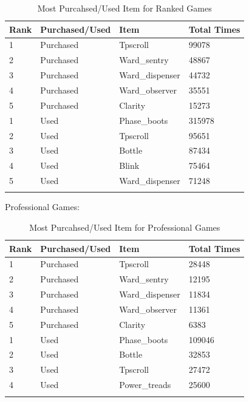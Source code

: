 \documentclass{article}
\begin{document}
\begin{longtable}{|p{2cm}|p{2cm}|p{3.5cm}|p{2.5cm}|}

\hline
\textbf{Rank} & \textbf{Purchased/Used} & \textbf{Item} & \textbf{Total Times} \\
\hline
\endhead

1 & Purchased & Tpscroll & 99078 \\\hline
2 & Purchased & Ward\_sentry & 48867 \\\hline
3 & Purchased & Ward\_dispenser & 44732 \\\hline
4 & Purchased & Ward\_observer & 35551 \\\hline
5 & Purchased & Clarity & 15273 \\\hline
1 & Used & Phase\_boots & 315978 \\\hline
2 & Used & Tpscroll & 95651 \\\hline
3 & Used & Bottle & 87434 \\\hline
4 & Used & Blink & 75464 \\\hline
5 & Used & Ward\_dispenser & 71248 \\\hline

\caption{Most Purcahsed/Used Item for Ranked Games}
\label{most-purchased-used-item-for-ranked-games}
\end{longtable}


Professional Games:

\begin{longtable}{|p{2cm}|p{2cm}|p{3.5cm}|p{2.5cm}|}

\hline
\textbf{Rank} & \textbf{Purchased/Used} & \textbf{Item} & \textbf{Total Times} \\
\hline
\endhead

1 & Purchased & Tpscroll & 28448 \\\hline
2 & Purchased & Ward\_sentry & 12195 \\\hline
3 & Purchased & Ward\_dispenser & 11834 \\\hline
4 & Purchased & Ward\_observer & 11361 \\\hline
5 & Purchased & Clarity & 6383 \\\hline
1 & Used & Phase\_boots & 109046 \\\hline
2 & Used & Bottle & 32853 \\\hline
3 & Used & Tpscroll & 27472 \\\hline
4 & Used & Power\_treads & 25600 \\\hline


\caption{Most Purcahsed/Used Item for Professional Games}
\label{most-purchased-used-item-for-professional-games}
\end{longtable}
\end{document}
